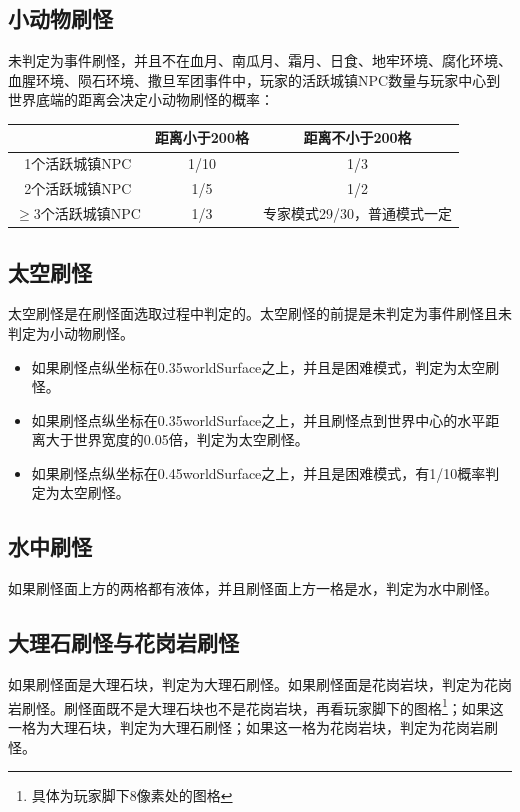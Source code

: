 \subsection{小动物刷怪}
未判定为事件刷怪，并且不在血月、南瓜月、霜月、日食、地牢环境、腐化环境、血腥环境、陨石环境、撒旦军团事件中，玩家的活跃城镇NPC数量与玩家中心到世界底端的距离会决定小动物刷怪的概率：
\begin{center}
\begin{tabular}{|c|c|c|}
    \hline
    &距离小于200格&距离不小于200格\\\hline
    1个活跃城镇NPC&1/10&1/3\\\hline
    2个活跃城镇NPC&1/5&1/2\\\hline
    $\ge$3个活跃城镇NPC&1/3&专家模式29/30，普通模式一定\\\hline
\end{tabular}
\end{center}

\subsection{太空刷怪}\label{app22}
太空刷怪是在刷怪面选取过程中判定的。太空刷怪的前提是未判定为事件刷怪且未判定为小动物刷怪。
\begin{itemize}
    \item 如果刷怪点纵坐标在0.35worldSurface之上，并且是困难模式，判定为太空刷怪。
    \item 如果刷怪点纵坐标在0.35worldSurface之上，并且刷怪点到世界中心的水平距离大于世界宽度的0.05倍，判定为太空刷怪。
    \item 如果刷怪点纵坐标在0.45worldSurface之上，并且是困难模式，有1/10概率判定为太空刷怪。
\end{itemize}

\subsection{水中刷怪}
如果刷怪面上方的两格都有液体，并且刷怪面上方一格是水，判定为水中刷怪。

\subsection{大理石刷怪与花岗岩刷怪}
如果刷怪面是大理石块，判定为大理石刷怪。如果刷怪面是花岗岩块，判定为花岗岩刷怪。刷怪面既不是大理石块也不是花岗岩块，再看玩家脚下的图格\footnote{具体为玩家脚下8像素处的图格}；如果这一格为大理石块，判定为大理石刷怪；如果这一格为花岗岩块，判定为花岗岩刷怪。

